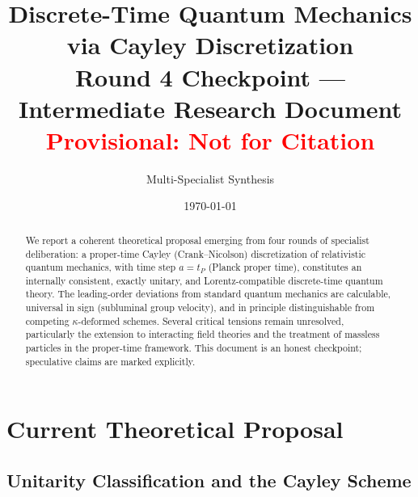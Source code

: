 \documentclass[11pt,a4paper]{article}
\title{\textbf{Discrete-Time Quantum Mechanics via Cayley Discretization}\\
\large Round 4 Checkpoint — Intermediate Research Document\\
\normalsize \textcolor{red}{Provisional: Not for Citation}}
\author{Multi-Specialist Synthesis}
\date{\today}
\begin{document}
\maketitle

\begin{abstract}
We report a coherent theoretical proposal emerging from four rounds of specialist deliberation: a proper-time Cayley (Crank--Nicolson) discretization of relativistic quantum mechanics, with time step $a = t_P$ (Planck proper time), constitutes an internally consistent, exactly unitary, and Lorentz-compatible discrete-time quantum theory. The leading-order deviations from standard quantum mechanics are calculable, universal in sign (subluminal group velocity), and in principle distinguishable from competing $\kappa$-deformed schemes. Several critical tensions remain unresolved, particularly the extension to interacting field theories and the treatment of massless particles in the proper-time framework. This document is an honest checkpoint; speculative claims are marked explicitly.
\end{abstract}

\tableofcontents
\vspace{1em}

\section{Current Theoretical Proposal}

\subsection{Unitarity Classification and the Cayley Scheme}
\end{document}
